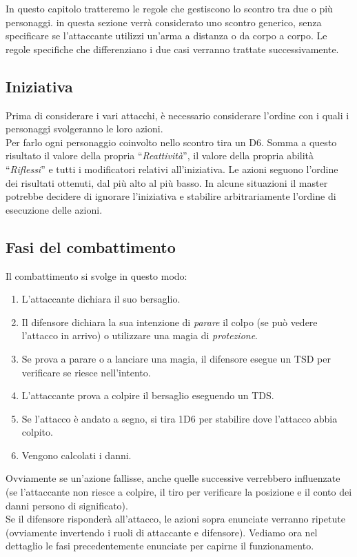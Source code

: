 \documentclass[../manuale_main.tex]{subfiles}
\begin{document}
In questo capitolo tratteremo le regole che gestiscono lo scontro tra due o più personaggi. in questa sezione verrà considerato uno scontro generico, senza specificare se l'attaccante utilizzi un'arma a distanza o da corpo a corpo. Le regole specifiche che differenziano i due casi verranno trattate successivamente.\\

\subsection{Iniziativa}
Prima di considerare i vari attacchi, è necessario considerare l'ordine con i quali i personaggi svolgeranno le loro azioni.\\
Per farlo ogni personaggio coinvolto nello scontro tira un D6. Somma a questo risultato il valore della propria ``\emph{Reattività}'', il valore della propria abilità ``\emph{Riflessi}'' e tutti i modificatori relativi all'iniziativa. Le azioni seguono l'ordine dei risultati ottenuti, dal più alto al più basso.
In alcune situazioni il master potrebbe decidere di ignorare l'iniziativa e stabilire arbitrariamente l'ordine di esecuzione delle azioni.

\subsection{Fasi del combattimento}
Il combattimento si svolge in questo modo:
\begin{enumerate}
\item L'attaccante dichiara il suo bersaglio.
\item Il difensore dichiara la sua intenzione di \emph{parare} il colpo (se può vedere l'attacco in arrivo) o utilizzare una magia di \emph{protezione}.
\item Se prova a parare o a lanciare una magia, il difensore esegue un TSD per verificare se riesce nell'intento.
\item L'attaccante prova a colpire il bersaglio eseguendo un TDS.
\item Se l'attacco è andato a segno, si tira 1D6 per stabilire dove l'attacco abbia colpito.
\item Vengono calcolati i danni.
\end{enumerate} 
Ovviamente se un'azione fallisse, anche quelle successive verrebbero influenzate (se l'attaccante non riesce a colpire, il tiro per verificare la posizione e il conto dei danni persono di significato).\\
Se il difensore risponderà all'attacco, le azioni sopra enunciate verranno ripetute (ovviamente invertendo i ruoli di attaccante e difensore).
Vediamo ora nel dettaglio le fasi precedentemente enunciate per capirne il funzionamento.
\end{document}
